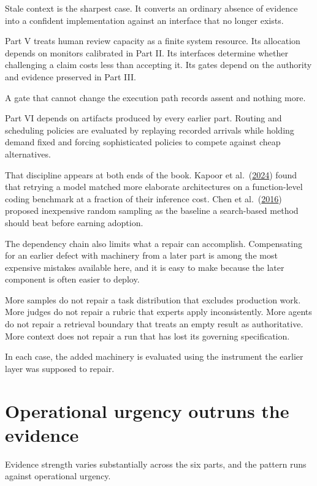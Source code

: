 Stale context is the sharpest case. It converts an ordinary absence of evidence into a confident implementation against an interface that no longer exists.

Part V treats human review capacity as a finite system resource. Its allocation depends on monitors calibrated in Part II. Its interfaces determine whether challenging a claim costs less than accepting it. Its gates depend on the authority and evidence preserved in Part III.

A gate that cannot change the execution path records assent and nothing more.

Part VI depends on artifacts produced by every earlier part. Routing and scheduling policies are evaluated by replaying recorded arrivals while holding demand fixed and forcing sophisticated policies to compete against cheap alternatives.

That discipline appears at both ends of the book. Kapoor et al.~(\href{https://arxiv.org/abs/2407.01502}{2024}) found that retrying a model matched more elaborate architectures on a function-level coding benchmark at a fraction of their inference cost. Chen et al.~(\href{https://arxiv.org/abs/1608.07617}{2016}) proposed inexpensive random sampling as the baseline a search-based method should beat before earning adoption.

The dependency chain also limits what a repair can accomplish. Compensating for an earlier defect with machinery from a later part is among the most expensive mistakes available here, and it is easy to make because the later component is often easier to deploy.

More samples do not repair a task distribution that excludes production work. More judges do not repair a rubric that experts apply inconsistently. More agents do not repair a retrieval boundary that treats an empty result as authoritative. More context does not repair a run that has lost its governing specification.

In each case, the added machinery is evaluated using the instrument the earlier layer was supposed to repair.

\section{Operational urgency outruns the evidence}\label{operational-urgency-outruns-the-evidence}

Evidence strength varies substantially across the six parts, and the pattern runs against operational urgency.

